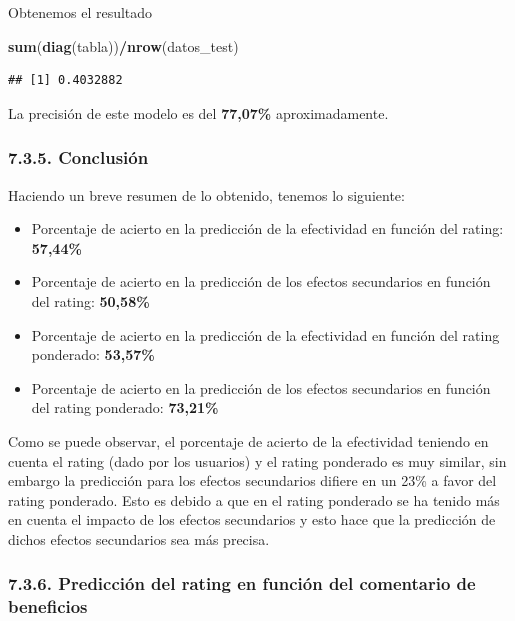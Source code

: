 \documentclass[spanish,]{article}
\newenvironment{Shaded}{\begin{snugshade}}{\end{snugshade}}
\newcommand{\KeywordTok}[1]{\textcolor[rgb]{0.13,0.29,0.53}{\textbf{#1}}}
\newcommand{\OperatorTok}[1]{\textcolor[rgb]{0.81,0.36,0.00}{\textbf{#1}}}
\newcommand{\NormalTok}[1]{#1}
\providecommand{\tightlist}{%
  \setlength{\itemsep}{0pt}\setlength{\parskip}{0pt}}
\begin{document}
Obtenemos el resultado

\begin{Shaded}
\begin{Highlighting}[]
\KeywordTok{sum}\NormalTok{(}\KeywordTok{diag}\NormalTok{(tabla))}\OperatorTok{/}\KeywordTok{nrow}\NormalTok{(datos_test)}
\end{Highlighting}
\end{Shaded}

\begin{verbatim}
## [1] 0.4032882
\end{verbatim}

La precisión de este modelo es del \textbf{77,07\%} aproximadamente.

\subsubsection{7.3.5. Conclusión}\label{conclusion}

Haciendo un breve resumen de lo obtenido, tenemos lo siguiente:

\begin{itemize}
\tightlist
\item
  Porcentaje de acierto en la predicción de la efectividad en función
  del rating: \textbf{57,44\%}
\item
  Porcentaje de acierto en la predicción de los efectos secundarios en
  función del rating: \textbf{50,58\%}
\item
  Porcentaje de acierto en la predicción de la efectividad en función
  del rating ponderado: \textbf{53,57\%}
\item
  Porcentaje de acierto en la predicción de los efectos secundarios en
  función del rating ponderado: \textbf{73,21\%}
\end{itemize}

Como se puede observar, el porcentaje de acierto de la efectividad
teniendo en cuenta el rating (dado por los usuarios) y el rating
ponderado es muy similar, sin embargo la predicción para los efectos
secundarios difiere en un 23\% a favor del rating ponderado. Esto es
debido a que en el rating ponderado se ha tenido más en cuenta el
impacto de los efectos secundarios y esto hace que la predicción de
dichos efectos secundarios sea más precisa.

\subsubsection{7.3.6. Predicción del rating en función del comentario de
beneficios}\label{prediccion-del-rating-en-funcion-del-comentario-de-beneficios}
\end{document}
